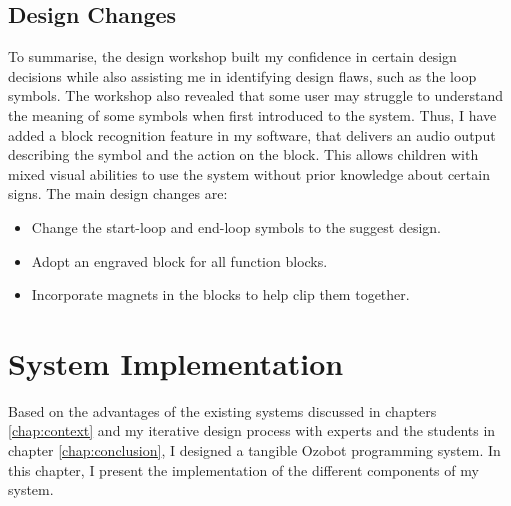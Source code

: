 \documentclass[oneside,%
                    author={Malak Hajji},
                    degree={BSc},
                    title={Designing An Accessible Computational Toolkit For Students},
                  subtitle={With Mixed Visual Abilities}]{dissertation}
\begin{document}
\section{Design Changes}
To summarise, the design workshop built my confidence in certain design decisions while also assisting me in identifying design flaws, such as the loop symbols. The workshop also revealed that some user may struggle to understand the meaning of some symbols when first introduced to the system. Thus, I have added a block recognition feature in my software, that delivers an audio output describing the symbol and the action on the block. This allows children with mixed visual abilities to use the system without prior knowledge about certain signs. The main design changes are:
\begin{itemize}
    \item Change the start-loop and end-loop symbols to the suggest design.
    \item Adopt an engraved block for all function blocks.
    \item Incorporate magnets in the blocks to help clip them together.
\end{itemize}






\chapter{System Implementation}
Based on the advantages of the existing systems discussed in chapters \ref{chap:context} and my iterative design process with experts and the students in chapter \ref{chap:conclusion}, I designed a tangible Ozobot programming system. In this chapter, I present the implementation of the different components of my system.
\end{document}
